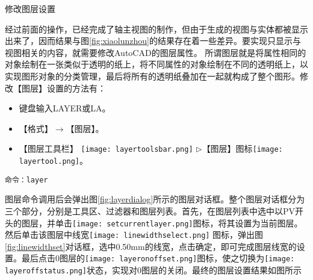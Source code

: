 \begin{procedure}

\item 修改图层设置

经过前面的操作，已经完成了轴主视图的制作，但由于生成的视图与实体都被显示出来了，因而结果与图\ref{fig:xiaolunzhou}的结果存在着一些差异。要实现只显示与视图相关的内容，就需要修改AutoCAD的图层属性。 所谓图层就是将属性相同的对象绘制在一张类似于透明的纸上，将不同属性的对象绘制在不同的透明纸上，以实现图形对象的分类管理，最后将所有的透明纸叠加在一起就构成了整个图形。修改【图层】设置的方法有：
\begin{itemize}
\item 键盘输入LAYER或LA。
\item 【格式】$\rightarrow$【图层】。
\item 【图层工具栏】 \texttt{[image: layertoolsbar.png]} $\triangleright$【图层】图标\texttt{[image: layertool.png]}。
\end{itemize}
\begin{lstlisting}
命令：layer
\end{lstlisting}

图层命令调用后会弹出图\ref{fig:layerdialog}所示的图层对话框。整个图层对话框分为三个部分，分别是工具区、过滤器和图层列表。首先，在图层列表中选中以PV开头的图层，并单击\texttt{[image: setcurrentlayer.png]}图标，将其设置为当前图层。然后单击该图层中线宽\texttt{[image: linewidthselect.png]} 图标，弹出图\ref{fig:linewidthset}对话框，选中0.50mm的线宽，点击确定，即可完成图层线宽的设置。最后点击0图层的\texttt{[image: layeronoffset.png]}图标，使之切换为\texttt{[image: layeroffstatus.png]}状态，实现对0图层的关闭。最终的图层设置结果如图所示


\end{procedure}
